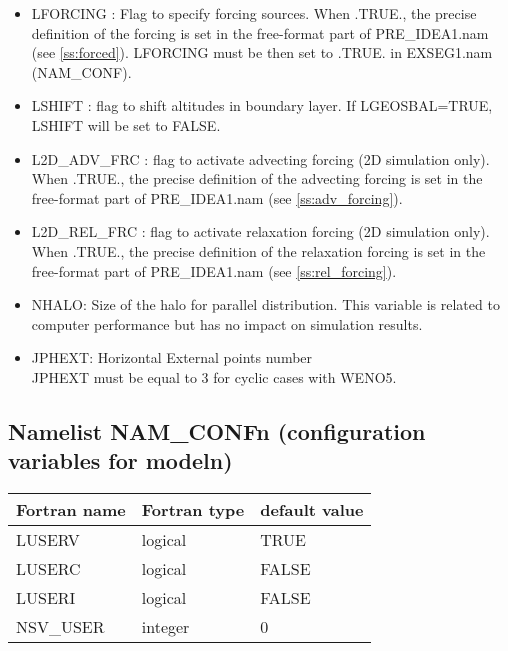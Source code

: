 \begin{itemize}
\item LFORCING  : Flag to 
specify forcing sources.
When .TRUE., the precise definition of the forcing is set in the free-format 
part of PRE\_IDEA1.nam (see \ref{ss:forced}). LFORCING must be then set to .TRUE. in EXSEG1.nam (NAM\_CONF).

\item LSHIFT  : flag to shift altitudes in boundary layer. If LGEOSBAL=TRUE, LSHIFT will be set to FALSE.

\item L2D\_ADV\_FRC  : flag to activate advecting forcing (2D simulation only). When .TRUE., the precise definition of the advecting forcing is set in the free-format 
part of PRE\_IDEA1.nam (see \ref{ss:adv_forcing}).

\item L2D\_REL\_FRC  : flag to activate relaxation forcing (2D simulation only). When .TRUE., the precise definition of the relaxation forcing is set in the free-format 
part of PRE\_IDEA1.nam (see \ref{ss:rel_forcing}).

 \item
NHALO: Size of the halo for parallel distribution.
This variable is related to computer performance but has no
impact on simulation results.\\

\item
JPHEXT:  Horizontal External points number\\
JPHEXT must be equal to 3 for cyclic cases with WENO5.

\end{itemize}


\subsection{Namelist NAM\_CONFn (configuration variables for
modeln)}

\begin{center}
\begin{tabular} {|l|l|l|}
\hline
Fortran name & Fortran type & default value \\
\hline
LUSERV    & logical & TRUE  \\
LUSERC    & logical & FALSE  \\
LUSERI    & logical & FALSE  \\
NSV\_USER  & integer & 0   \\  
\hline
\end{tabular}
\end{center}

